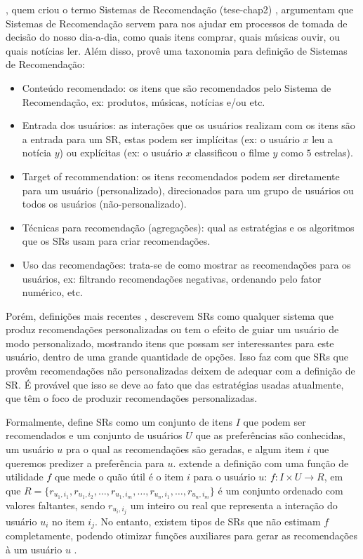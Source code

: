 \documentclass[normaltoc, espacoumemeio, pnumromarab,ruledheader]{abnt}
\begin{document}
, quem criou o termo Sistemas de Recomendação (tese-chap2) \cite{Neumann2007}, argumentam que Sistemas de Recomendação servem para nos ajudar em processos de tomada de decisão do nosso dia-a-dia, como quais itens comprar, quais músicas ouvir, ou quais notícias ler.
Além disso,  provê uma taxonomia para definição de Sistemas de Recomendação:
\begin{itemize}
  \item Conteúdo recomendado: os itens que são recomendados pelo Sistema de Recomendação, ex: produtos, músicas, notícias e/ou etc.
  \item Entrada dos usuários: as interações que os usuários realizam com os itens são a entrada para um SR, estas podem ser implícitas (ex: o usuário $x$ leu a notícia $y$) ou explícitas (ex: o usuário $x$ classificou o filme $y$ como $5$ estrelas).
  \item Target of recommendation: os itens recomendados podem ser diretamente para um usuário (personalizado), direcionados para um grupo de usuários ou todos os usuários (não-personalizado).
  \item Técnicas para recomendação (agregações): qual as estratégias e os algoritmos que os SRs usam para criar recomendações.
  \item Uso das recomendações: trata-se de como mostrar as recomendações para os usuários, ex: filtrando recomendações negativas, ordenando pelo fator numérico, etc.
\end{itemize}

Porém, definições mais recentes \cite{Burke2002,Burke2007}, descrevem SRs como qualquer sistema que produz recomendações personalizadas ou tem o efeito de guiar um usuário de modo personalizado, mostrando itens que possam ser interessantes para este usuário, dentro de uma grande quantidade de opções.
Isso faz com que SRs que provêm recomendações não personalizadas deixem de adequar com a definição de SR.
É provável que isso se deve ao fato que das estratégias usadas atualmente, que têm o foco de produzir recomendações personalizadas.

Formalmente,  define SRs como um conjunto de itens $I$  que podem ser recomendados e um conjunto de usuários $U$ que as preferências são conhecidas, um usuário $u$ pra o qual as recomendações são geradas, e algum item $i$ que queremos predizer a preferência para $u$.
 extende a definição com uma função de utilidade $f$ que mede o quão útil é o item $i$ para o usuário $u$: $f: I \times U \rightarrow R$, em que $R = \{ r_{u_1,i_1}, r_{u_1,i_2}, \dots, r_{u_1,i_m}, \dots, r_{u_n,i_1}, \dots, r_{u_n,i_m} \}$ é um conjunto ordenado com valores faltantes, sendo $r_{u_i,i_j}$ um inteiro ou real que representa a interação do usuário $u_i$ no item $i_j$.
No entanto, existem tipos de SRs que não estimam $f$ completamente, podendo otimizar funções auxiliares para gerar as recomendações à um usuário $u$ \cite{Lops2011}.
\end{document}
